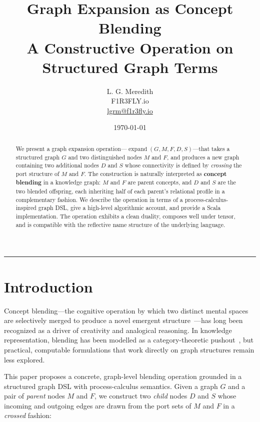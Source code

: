 \documentclass[11pt, a4paper]{article}
\theoremstyle{definition}
\theoremstyle{plain}
\theoremstyle{remark}
\newcommand{\expand}{\operatorname{expand}}
\begin{document}
\title{\textbf{Graph Expansion as Concept Blending}\\[0.5em]
  \large A Constructive Operation on Structured Graph Terms}

\author{L. G. Meredith\\
  \small F1R3FLY.io\\[0.3em]
  \small \href{mailto:lgrm@f1r3fly.io}{lgrm@f1r3fly.io}}

\date{\today}

\maketitle
\thispagestyle{fancy}

\begin{abstract}
We present a graph expansion operation---$\expand(G, M, F, D, S)$---that takes
a structured graph $G$ and two distinguished nodes $M$ and $F$, and produces a
new graph containing two additional nodes $D$ and $S$ whose connectivity is
defined by \emph{crossing} the port structure of $M$ and $F$. The construction
is naturally interpreted as \textbf{concept blending} in a knowledge graph: $M$
and $F$ are parent concepts, and $D$ and $S$ are the two blended offspring,
each inheriting half of each parent's relational profile in a complementary
fashion. We describe the operation in terms of a process-calculus-inspired graph
DSL, give a high-level algorithmic account, and provide a Scala implementation.
The operation exhibits a clean duality, composes well under tensor, and is
compatible with the reflective name structure of the underlying language.
\end{abstract}

\tableofcontents
\bigskip\hrule\bigskip

\section{Introduction}
\label{sec:intro}

Concept blending---the cognitive operation by which two distinct mental spaces
are selectively merged to produce a novel emergent structure~\cite{fauconnier1998}---has
long been recognized as a driver of creativity and analogical reasoning.  In
knowledge representation, blending has been modelled as a category-theoretic
pushout~\cite{goguen2005}, but practical, computable formulations that work
directly on graph structures remain less explored.

This paper proposes a concrete, graph-level blending operation grounded in a
structured graph DSL with process-calculus semantics.  Given a graph $G$ and a
pair of \emph{parent} nodes $M$ and $F$, we construct two \emph{child} nodes
$D$ and $S$ whose incoming and outgoing edges are drawn from the port sets of
$M$ and $F$ in a \emph{crossed} fashion:
\end{document}
